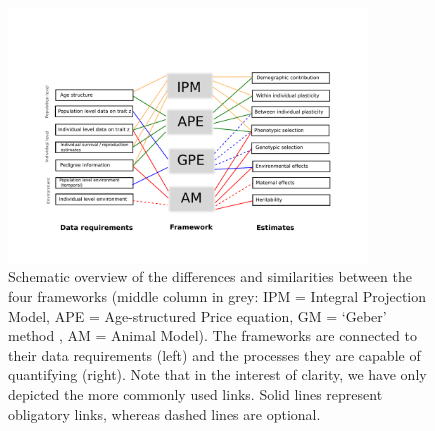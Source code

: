 \newpage
\begin{figure}
\centering
\includegraphics[width=0.85\textwidth]{FiguresDecPop/FigureOverview}
\caption{Schematic overview of the differences and similarities between the four frameworks (middle column in grey: IPM = Integral Projection Model, APE = Age-structured Price equation, GM = `Geber' method , AM = Animal Model). The frameworks are connected to their data requirements (left) and the processes they are capable of quantifying (right). Note that in the interest of clarity, we have only depicted the more commonly used links. Solid lines represent obligatory links, whereas dashed lines are optional.}
\label{overview}
\end{figure}

\newpage

